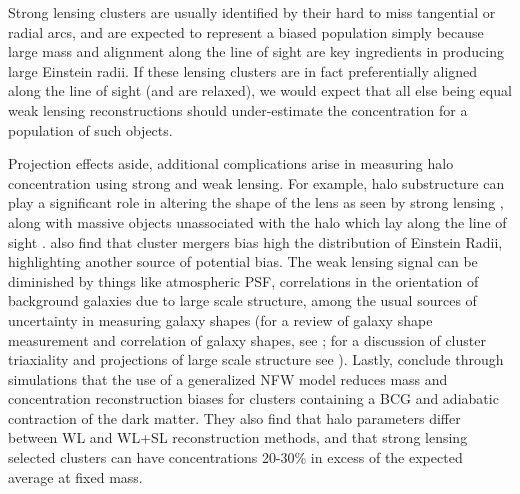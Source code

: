 Strong lensing clusters are usually identified by their hard to miss
tangential or radial arcs, and are expected to represent a biased
population simply because large mass and alignment along the line of
sight are key ingredients in producing large Einstein radii. If these
lensing clusters are in fact preferentially aligned along the line of
sight (and are relaxed), we would expect that all else being 
equal weak lensing reconstructions should under-estimate the
concentration for a population of such objects.   
  
Projection effects aside, additional complications arise in measuring
halo concentration using strong and weak lensing. For example, halo
substructure can play a significant role in altering the shape of the
lens as seen by strong lensing \citep{MeneghettiEtAl2007},  along with
massive objects unassociated with the halo which lay along the line of
sight \citep{PuchweinHilbert2009}.  \citet{RedlichEtAl2012} also find
that cluster mergers bias high the distribution of Einstein Radii,
highlighting another source of potential bias. The weak lensing signal
can be diminished by things like atmospheric PSF, correlations in the
orientation of background galaxies due to large scale structure, among
the usual sources of uncertainty in measuring galaxy shapes (for a
review of galaxy shape measurement and correlation of galaxy shapes,
see \citealt{HoekstraJain2008}; for a discussion of cluster triaxiality
and projections of large scale structure see
\citealt{BeckerKravtsov2011}). Lastly, \citet{GiocoliEtAl2014}
  conclude through simulations that the use of a generalized NFW model
  reduces mass and concentration reconstruction biases for clusters
 containing a BCG and adiabatic contraction of the dark matter. They
 also find that halo parameters differ between WL and WL+SL
 reconstruction methods, and that strong lensing selected clusters can
have concentrations 20-30\% in excess of the expected average at fixed
mass. 

